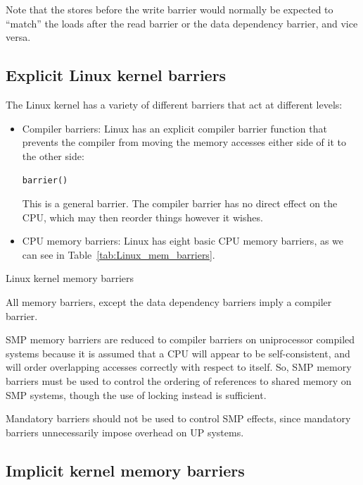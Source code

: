 Note that the stores before the write barrier would normally be expected to ``match'' the
loads after the read barrier or the data dependency barrier, and vice versa.

\subsection{Explicit Linux kernel barriers\label{sec:barrier_Linux}}

The Linux kernel has a variety of different barriers that act at different levels:

\begin{itemize}

\item Compiler barriers: Linux has an explicit compiler barrier function that prevents the
compiler from moving the memory accesses either side of it to the other side:

\begin{center}
\texttt{barrier()}
\end{center}

This is a general barrier.
The compiler barrier has no direct effect on the CPU, which may then reorder things however
it wishes.

\item CPU memory barriers: Linux has eight basic CPU memory barriers, as we can see in
Table~\ref{tab:Linux_mem_barriers}.

\end{itemize}

\begin{table}[htb]

\caption{Linux kernel memory barriers}
\label{tab:Linux_mem_barriers}
\end{table}

All memory barriers, except the data dependency barriers imply a compiler barrier.

SMP memory barriers are reduced to compiler barriers on uniprocessor compiled systems
because it is assumed that a CPU will appear to be self-consistent, and will order
overlapping accesses correctly with respect to itself. So, SMP memory barriers must
be used to control the ordering of references to shared memory on SMP systems, though
the use of locking instead is sufficient.

Mandatory barriers should not be used to control SMP effects, since mandatory barriers
unnecessarily impose overhead on UP systems.

\subsection{Implicit kernel memory barriers\label{sec:implicit_kernel_barriers}}

